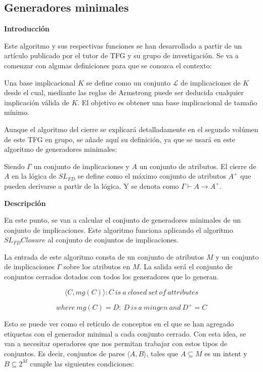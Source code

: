         
\subsection{Generadores minimales}


    \textbf{Introducci\'on}

    Este algoritmo y sus respectivas funciones se han desarrollado a partir de un art\'iculo publicado por el tutor de 
    TFG y su grupo de investigaci\'on\cite{cla2012}.
    Se va a comenzar con algunas definiciones para que se conozca el contexto:

    Una base implicacional \(K\) se define como un conjunto \(\mathcal{L}\) de implicaciones de \(K\) desde el cual, mediante las reglas de 
    Armstrong puede ser deducida cualquier implicaci\'on v\'alida de \(K\). El objetivo es obtener una base implicacional de tama\~no 
    m\'inimo.

    Aunque el algoritmo del cierre se explicar\'a detalladamente en el segundo vol\'umen de este TFG en grupo, se a\~nade aqu\'i su 
    definici\'on, ya que se usar\'a en este algoritmo de generadores minimales:

    Siendo \(\Gamma\) un conjunto de implicaciones y \(A\) un conjunto de atributos. El cierre de \(A\) en la l\'ogica de \(SL_{FD}\) se define como 
    el m\'aximo conjunto de atributos \(A^+\) que pueden derivarse a partir de la l\'ogica. Y se denota como \(\Gamma \vdash A \rightarrow A^+\).


    \bigskip
    \textbf{Descripci\'on}

    En este punto, se van a calcular el conjunto de generadores minimales de un conjunto de implicaciones. Este algoritmo funciona aplicando 
    el algoritmo \(SL_{FD}Closure\) al conjunto de conjuntos de implicaciones.

    La entrada de este algoritmo consta de un conjunto de atributos \(M\) y un conjunto de implicaciones \(\Gamma\) sobre los atributos en \(M\).
    La salida ser\'a el conjunto de conjuntos cerrados dotados con todos los generadores que lo generan.

    \[
        {\langle C, mg(C) \rangle : C ~ is ~ a ~ closed ~ set ~ of ~ attributes}    
    \]

    \[
        where ~ mg(C) = {D: ~ D ~ is ~ a ~ mingen ~ and ~ D^+ = C}    
    \]

    Esto se puede ver como el ret\'iculo de conceptos en el que se han agregado etiquetas con el generador minimal a cada conjunto cerrado.
    Con esta idea, se van a necesitar operadores que nos permitan trabajar con estos tipos de conjuntos. Es decir, conjuntos de pares 
    \( \langle A, B \rangle \), tales que \( A \subseteq M\) es un intent y \( B \subseteq 2^M\) cumple las siguientes condiciones:

